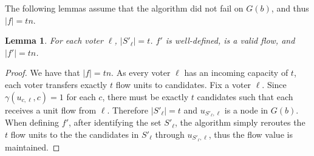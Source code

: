 \documentclass[letterpaper]{article} %
\newtheorem{lemma}{Lemma}
\newcommand{\abs}[1]{\lvert{#1}\rvert}
\begin{document}
The following lemmas assume that the algorithm did not fail on $G(b)$, and thus $\abs{f} = tn$.
\begin{lemma}
For each voter $\ell$, $\abs{S'_\ell}=t$. $f'$ is well-defined, is a valid flow, and  $\abs{f'} = tn$.
\end{lemma}
\begin{proof}
We have that $\abs{f} = tn$. As every voter $\ell$ has an incoming capacity of $t$, each voter transfers exactly $t$ flow units to candidates. 
Fix a voter $\ell$. Since $\gamma(u_{c,\ell},c) = 1$ for each $c$, there must be exactly $t$ candidates
such that each receives a unit flow from $\ell$. Therefore $\abs{S'_\ell}=t$ and $u_{S'_\ell, \ell}$ is a node in $G(b)$. When defining $f'$, after identifying the set $S'_\ell$, the algorithm simply reroutes the $t$ flow units to the the candidates in $S'_\ell$ through $u_{S'_\ell, \ell}$, thus the flow value is maintained.
\end{proof}
\end{document}
